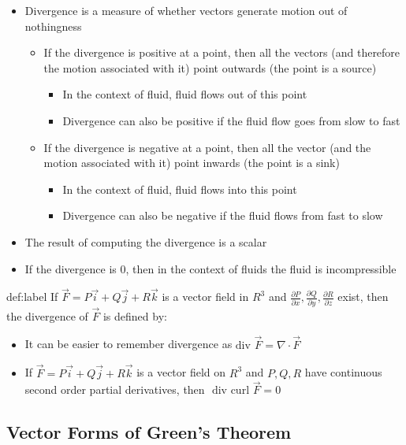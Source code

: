 \documentclass{package/notes}
\begin{document}
\begin{itemize}
	\item Divergence is a measure of whether vectors generate motion out of nothingness
	\begin{itemize}
		\item If the divergence is positive at a point, then all the vectors (and therefore the motion associated with it) point outwards (the point is a source)
		\begin{itemize}
			\item In the context of fluid, fluid flows out of this point
			\item Divergence can also be positive if the fluid flow goes from slow to fast
		\end{itemize}
		\item If the divergence is negative at a point, then all the vector (and the motion associated with it) point inwards (the point is a sink)
		\begin{itemize}
			\item In the context of fluid, fluid flows into this point
			\item Divergence can also be negative if the fluid flows from fast to slow
		\end{itemize}
	\end{itemize}
	\item The result of computing the divergence is a scalar
	\item If the divergence is $0$, then in the context of fluids the fluid is incompressible
\end{itemize}

\begin{definition}[Divergence]{def:label}
	If $\vec F = P\vec i + Q\vec j + R\vec k$ is a vector field in $R^3$ and $\frac{\partial P}{\partial x}, \frac{\partial Q}{\partial y}, \frac{\partial R}{\partial z}$ exist, then the divergence of $\vec F$ is defined by:
\end{definition}

\begin{itemize}
	\item It can be easier to remember divergence as $\text{div }  \vec F = \nabla \cdot \vec F$
	\item If $\vec F = P\vec i + Q\vec j + R\vec k$ is a vector field on $R^3$ and $P,Q,R$ have continuous second order partial derivatives, then $\text{ div curl }\vec F = 0$
\end{itemize}


\subsection{Vector Forms of Green's Theorem}
\end{document}
